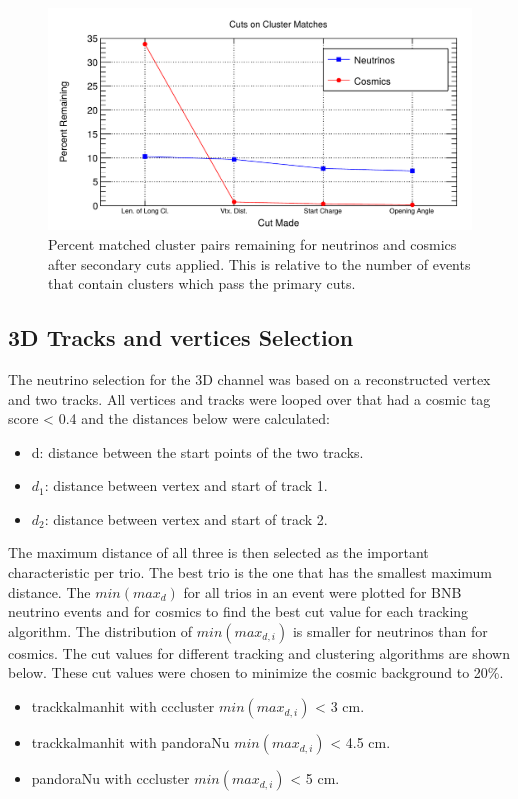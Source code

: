 \begin{figure}[htp!]
\centering
\includegraphics[width=\textwidth]{figs/2dsecondarycut.png}
\caption{Percent matched cluster pairs remaining for neutrinos and cosmics after secondary cuts applied. This is relative to the number of events that contain clusters which pass the primary cuts.}
\label{fig:2dsecondarycuts}
\end{figure}

\subsection{3D Tracks and vertices Selection}
The neutrino selection for the 3D channel was based on a reconstructed vertex and two tracks. All vertices and tracks were looped over that had a cosmic tag score < 0.4 and the distances below were calculated:
\begin{itemize}
\item d: distance between the start points of the two tracks.
\item $d_1$: distance between vertex and start of track 1.
\item $d_2$: distance between vertex and start of track 2.
\end{itemize}
The maximum distance of all three is then selected as the important characteristic per trio. The best trio is the one that has the smallest maximum distance. The $min(max_{d})$ for all trios in an event were plotted for BNB neutrino events and for cosmics to find the best cut value for each tracking algorithm. The distribution of $min(max_{d,i})$ is smaller for neutrinos than for cosmics. The cut values for different tracking and clustering algorithms are shown below. These cut values were chosen to minimize the cosmic background to 20\%. 
\begin{itemize}
\item trackkalmanhit with cccluster $min(max_{d,i})$ < 3 cm.
\item trackkalmanhit with pandoraNu $min(max_{d,i})$ < 4.5 cm.
\item pandoraNu with cccluster $min(max_{d,i})$ < 5 cm.
\end{itemize}

